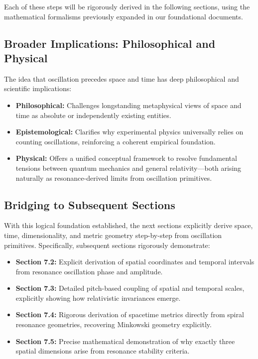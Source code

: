 Each of these steps will be rigorously derived in the following sections, using the mathematical formalisms previously expanded in our foundational documents.

\subsection{Broader Implications: Philosophical and Physical}

The idea that oscillation precedes space and time has deep philosophical and scientific implications:
\begin{itemize}
    \item \textbf{Philosophical:} Challenges longstanding metaphysical views of space and time as absolute or independently existing entities.
    \item \textbf{Epistemological:} Clarifies why experimental physics universally relies on counting oscillations, reinforcing a coherent empirical foundation.
    \item \textbf{Physical:} Offers a unified conceptual framework to resolve fundamental tensions between quantum mechanics and general relativity—both arising naturally as resonance-derived limits from oscillation primitives.
\end{itemize}

\subsection{Bridging to Subsequent Sections}

With this logical foundation established, the next sections explicitly derive space, time, dimensionality, and metric geometry step-by-step from oscillation primitives. Specifically, subsequent sections rigorously demonstrate:
\begin{itemize}
    \item \textbf{Section 7.2:} Explicit derivation of spatial coordinates and temporal intervals from resonance oscillation phase and amplitude.
    \item \textbf{Section 7.3:} Detailed pitch-based coupling of spatial and temporal scales, explicitly showing how relativistic invariances emerge.
    \item \textbf{Section 7.4:} Rigorous derivation of spacetime metrics directly from spiral resonance geometries, recovering Minkowski geometry explicitly.
    \item \textbf{Section 7.5:} Precise mathematical demonstration of why exactly three spatial dimensions arise from resonance stability criteria.
\end{itemize}

